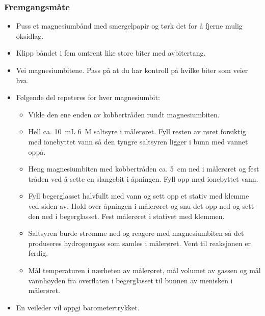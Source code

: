 	\subsubsection{Fremgangsmåte}
	\begin{itemize}
		\item Puss et magnesiumbånd med smergelpapir og tørk det for å fjerne mulig oksidlag.
		
		\item Klipp båndet i fem omtrent like store biter med avbitertang.
		
		\item Vei magnesiumbitene. Pass på at du har kontroll på hvilke biter som veier hva.
		
		\item Følgende del repeteres for hver magnesiumbit:
		\begin{itemize}
			\item Vikle den ene enden av kobbertråden rundt magnesiumbiten. 
			
			\item Hell ca. \SI{10}{mL} \SI{6}{M} saltsyre i målerøret. Fyll resten av røret forsiktig med ionebyttet vann så den tyngre saltsyren ligger i bunn med vannet oppå.
			
			\item Heng magnesiumbiten med kobbertråden ca. \SI{5}{cm} ned i målerøret og fest tråden ved å sette en slangebit i åpningen. Fyll opp med ionebyttet vann.
			
			\item Fyll begerglasset halvfullt med vann og sett opp et stativ med klemme ved siden av. Hold over åpningen i målerøret og snu det opp ned og sett den ned i begerglasset. Fest målerøret i stativet med klemmen.
			
			\item Saltsyren burde strømme ned og reagere med magnesiumbiten så det produseres hydrogengass som samles i målerøret. Vent til reaksjonen er ferdig.
			
			\item Mål temperaturen i nærheten av målerøret, mål volumet av gassen og mål vannhøyden fra overflaten i begerglasset til bunnen av menisken i målerøret.
		\end{itemize}
	
		\item En veileder vil oppgi barometertrykket.
		
	\end{itemize}	
	
	
	
	
